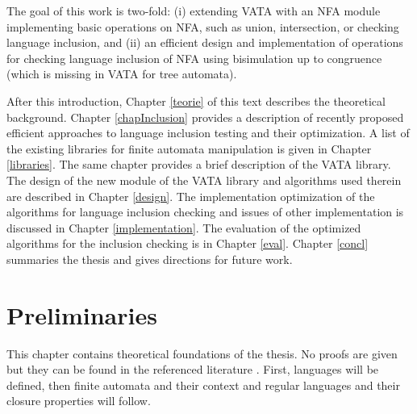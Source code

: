 The goal of this work is two-fold: (i) extending VATA with an NFA module implementing basic operations on NFA, such as union, intersection, or 
checking language inclusion, and (ii) an efficient design and implementation of operations for checking language inclusion of NFA using 
bisimulation up to congruence (which is missing in VATA for tree automata).

After this introduction, Chapter \ref{teorie} of this text describes the theoretical background. 
Chapter \ref{chapInclusion} provides a description of recently proposed 
efficient approaches to language inclusion testing and their optimization.
A list of the existing libraries for finite automata manipulation is given in Chapter \ref{libraries}. The same chapter
provides a brief description of the VATA library.
The design of the new module of the VATA library and algorithms used therein are described in Chapter \ref{design}. 
The implementation optimization of the algorithms for language inclusion checking and issues of other implementation is discussed in Chapter \ref{implementation}.
The evaluation of the optimized algorithms for the inclusion checking is in Chapter \ref{eval}. Chapter \ref{concl} summaries the thesis and gives directions for
future work.

\chapter{Preliminaries}
This chapter contains theoretical foundations of the thesis. No proofs are given but they can be found in the referenced literature \cite{kozen,ullman}. 
First, languages will be defined, then finite automata and their context and regular languages and their closure properties will follow. 
\label{teorie}

